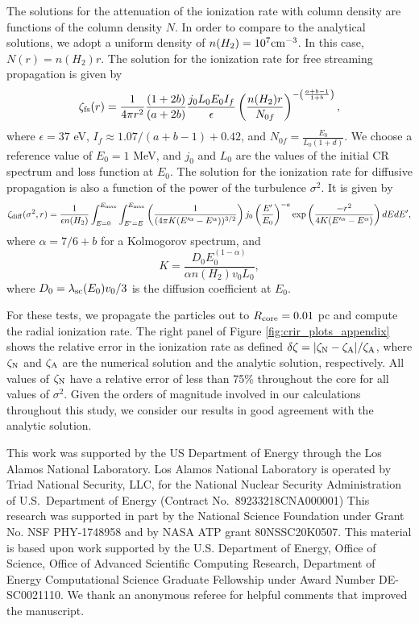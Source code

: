 \documentclass[twocolumn]{aastex63}
\def\lp{\left(}
\def\rp{\right)}
\def\t{\text}
\begin{document}
The solutions for the attenuation of the ionization rate with column density are functions of the column density $N$. In order to compare to the analytical solutions, we adopt a uniform density of $n(H_2)=10^{7} \rm cm^{-3}$. In this case, $N(r)=n(H_2) r$. The solution for the ionization rate for free streaming propagation is given by
\begin{equation}
    \zeta_{\rm fs}(r)= \frac{1}{4 \pi r^2} \frac{(1+2b)}{(a+2b)}\frac{j_0 L_0 E_0 I_f}{\epsilon}\lp\frac{n(H_2)r}{N_{0f}}\rp^{-\lp\frac{a+b-1}{1+b}\rp},
\end{equation}
where $\epsilon=37$ eV, $I_f \approx 1.07/(a+b-1)+0.42$, and $N_{0f}=\frac{E_0}{L_0(1+d)}$. We choose a reference value of $E_0=1$ MeV, and $j_0$ and $L_0$ are the values of the initial CR spectrum and loss function at $E_0$. The solution for the ionization rate for diffusive propagation is also a function of the power of the turbulence $\sigma^2$. It is given by
\begin{equation}
    \zeta_{\rm diff}(\sigma^2, r)=\frac{1}{\epsilon n(H_2)}\int_{E=0}^{E_{\rm max}}\int_{E'=E}^{E_{\rm max}} \lp\frac{1}{(4\pi K (E'^{\alpha}-E^{\alpha}))^{3/2}}\rp j_0\lp\frac{E'}{E_0}\rp^{-a}\t{exp}\lp\frac{-r^2}{4K(E'^{\alpha}-E^{\alpha})}\rp dE dE', 
\end{equation}
where $\alpha=7/6+b$ for a Kolmogorov spectrum, and 
\begin{equation}
    K=\frac{D_0E_0^{(1-\alpha)}}{\alpha n(H_2) v_0 L_0},
\end{equation}
where $D_0=\lambda_{\rm sc}(E_0) v_0/3$ is the diffusion coefficient at $E_0$.

For these tests, we propagate the particles out to $R_{\rm core}=0.01$ pc and compute the radial ionization rate.  The right panel of Figure \ref{fig:crir_plots_appendix} shows the relative error in the ionization rate as defined $\delta \zeta=|\zeta_{\rm N}-\zeta_{\rm A}|/\zeta_{\rm A}$, where $\zeta_{\rm N}$ and $\zeta_{\rm A}$ are the numerical solution and the analytic solution, respectively. All values of $\zeta_{\rm N}$ have a relative error of less than 75\% throughout the core for all values of $\sigma^2$. Given the orders of magnitude involved in our calculations throughout this study, we consider our results in good agreement with the analytic solution.

\acknowledgements

This work was supported by the US Department of Energy through the Los Alamos National Laboratory. Los Alamos National Laboratory is operated by Triad National Security, LLC, for the National Nuclear Security Administration of U.S.\ Department of Energy (Contract No.\ 89233218CNA000001) This research was supported in part by the National Science Foundation under Grant No. NSF PHY-1748958 and by NASA ATP grant 80NSSC20K0507. This material is based upon work supported by the U.S. Department of Energy, Office of Science, Office of Advanced Scientific Computing Research, Department of Energy Computational Science Graduate Fellowship under Award Number DE-SC0021110. 
We thank an anonymous referee for helpful comments that improved the manuscript.


\end{document}
